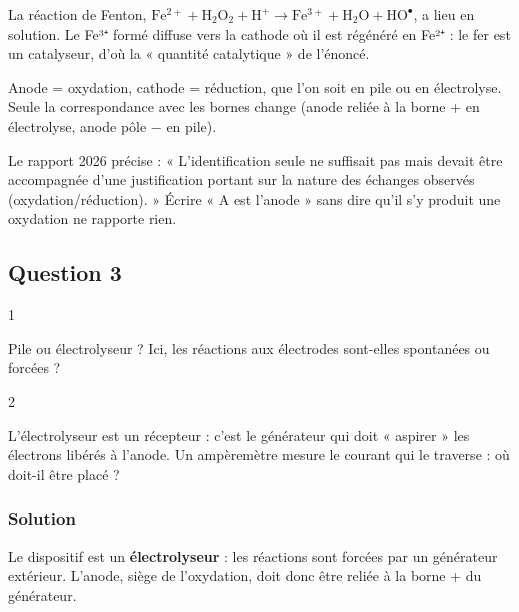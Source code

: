 \documentclass[11pt,a4paper]{article}
\begin{document}
La réaction de Fenton, \(\mathrm{Fe^{2+}}+\mathrm{H_2O_2}+\mathrm{H^+}\to\mathrm{Fe^{3+}}+\mathrm{H_2O}+\mathrm{HO^\bullet}\), a lieu en solution. Le Fe³⁺ formé diffuse vers la cathode où il est régénéré en Fe²⁺ : le fer est un catalyseur, d'où la « quantité catalytique » de l'énoncé.

\begin{methode}

Anode = oxydation, cathode = réduction, que l'on soit en pile ou en électrolyse. Seule la correspondance avec les bornes change (anode reliée à la borne + en électrolyse, anode pôle − en pile).

\end{methode}

\begin{jury}

Le rapport 2026 précise : « L'identification seule ne suffisait pas mais devait être accompagnée d'une justification portant sur la nature des échanges observés (oxydation/réduction). » Écrire « A est l'anode » sans dire qu'il s'y produit une oxydation ne rapporte rien.

\end{jury}

\hypertarget{question-3}{%
\subsection{Question 3}\label{question-3}}

\begin{indication}{1}

Pile ou électrolyseur ? Ici, les réactions aux électrodes sont-elles spontanées ou forcées ?

\end{indication}

\begin{indication}{2}

L'électrolyseur est un récepteur : c'est le générateur qui doit « aspirer » les électrons libérés à l'anode. Un ampèremètre mesure le courant qui le traverse : où doit-il être placé ?

\end{indication}

\hypertarget{solution-2}{%
\subsubsection{Solution}\label{solution-2}}

Le dispositif est un \textbf{électrolyseur} : les réactions sont forcées par un générateur extérieur. L'anode, siège de l'oxydation, doit donc être reliée à la borne + du générateur.
\end{document}
